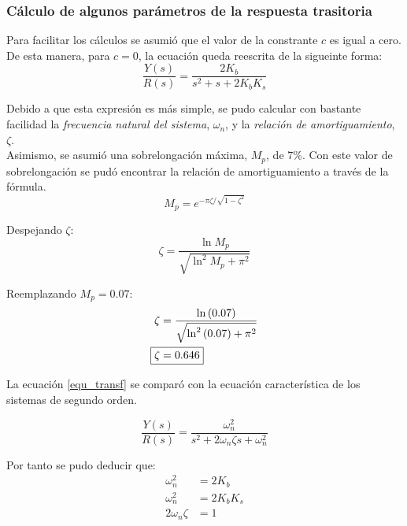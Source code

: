 \documentclass[journal]{IEEEtran}
\begin{document}

\subsubsection*{C\'alculo de algunos par\'ametros de la 
respuesta trasitoria}
Para facilitar los c\'alculos se asumi\'o que el valor de la
constrante $c$ es igual a cero. De esta manera, para 
$c = 0$, la ecuaci\'on queda reescrita de la sigueinte 
forma: 
\begin{equation}
	\frac{Y(s)}{R(s)} = \frac{2 K_b}
	{s^2 + s + 2 K_b K_s }
	\label{equ_transf}
\end{equation}

Debido a que esta expresi\'on es m\'as simple, se pudo 
calcular con bastante facilidad la \textit{frecuencia 
natural del sistema}, $\omega_n$, y la \textit{relaci\'on 
de amortiguamiento}, $\zeta$. \\

Asimismo, se asumi\'o una sobrelongaci\'on m\'axima, 
$M_p$, de
7\%. Con este valor de sobrelongaci\'on se pud\'o encontrar 
la relaci\'on de amortiguamiento a trav\'es de la f\'ormula.
\begin{displaymath}
	M_p = e^{-\pi \zeta / \sqrt{1 - \zeta^2}}  
\end{displaymath}

Despejando $\zeta$:
\begin{displaymath}
	\zeta = \frac{\ln{M_p}}{\sqrt{\ln^2{M_p} + \pi^2}}
\end{displaymath}

Reemplazando $M_p = 0.07$: 
\begin{align*}
	\zeta & = \frac{\ln{(0.07)}}
	{\sqrt{\ln^2{(0.07)} + \pi^2}} \\
	\Aboxed { \zeta & = 0.646}
\end{align*}

La ecuaci\'on \ref{equ_transf} se compar\'o con la ecuaci\'on 
caracter\'istica de los sistemas de segundo orden. 

\begin{equation}
\frac{Y(s)}{R(s)} = \frac{\omega^2_n}
{s^2 + 2 \omega_n \zeta s + \omega^2_n}
\end{equation}

Por tanto se pudo deducir que:  
\begin{align}
	\label{equ5} \omega^2_n & = 2 K_b \\
	\label{equ6} \omega^2_n & = 2 K_b K_s \\
	\label{equ7} 2 \omega_n \zeta & = 1 
\end{align}
\end{document}
